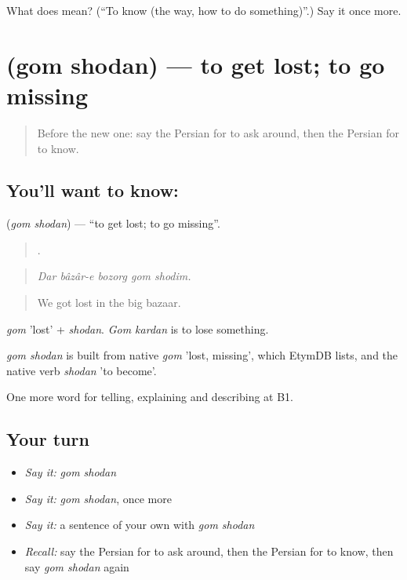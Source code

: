 \begin{tcolorbox}[breakable,colback=teal!4,colframe=teal!35!black,title={Before you move on}]
What does   mean? (\textquotedblleft{}To know (the way, how to do something)\textquotedblright{}.) Say it once more.
\end{tcolorbox}
\section[\texorpdfstring{\fa{گم} \fa{شدن} (gom shodan)}{گم شدن (gom shodan)}]{  (gom shodan) — to get lost; to go missing}

\label{lesson:FA-C444-gom-shodan}



\begin{quote}
Before the new one: say the Persian for to ask around, then the Persian for to know.
\end{quote}

\subsection*{You'll want to know:  }
\textbf{ } (\emph{gom shodan}) — \textquotedblleft{}to get lost; to go missing\textquotedblright{}.

\begin{quote}
    .
\end{quote}

\begin{quote}
\emph{Dar bâzâr-e bozorg gom shodim.}
\end{quote}

\begin{quote}
We got lost in the big bazaar.
\end{quote}

\emph{gom} 'lost' + \emph{shodan}. \emph{Gom kardan} is to lose something.

\begin{cousinweb}
\emph{gom shodan} is built from native \emph{gom} 'lost, missing', which EtymDB lists, and the native verb \emph{shodan} 'to become'.
\end{cousinweb}

\begin{grammarlens}[title={What you've built}]
One more word for telling, explaining and describing at B1.
\end{grammarlens}

\subsection*{Your turn}
\begin{itemize}
\raggedright
  \item \emph{Say it:} \emph{gom shodan}
  \item \emph{Say it:} \emph{gom shodan}, once more
  \item \emph{Say it:} a sentence of your own with \emph{gom shodan}
  \item \emph{Recall:} say the Persian for to ask around, then the Persian for to know, then say \emph{gom shodan} again
\end{itemize}


